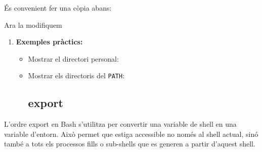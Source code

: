 \documentclass[
  12 pt,
  a4paper,
]{article}
\newenvironment{Shaded}{\begin{snugshade}}{\end{snugshade}}
\newcommand{\BuiltInTok}[1]{#1}
\newcommand{\NormalTok}[1]{#1}
\newcommand{\OperatorTok}[1]{\textcolor[rgb]{0.81,0.36,0.00}{\textbf{#1}}}
\newcommand{\StringTok}[1]{\textcolor[rgb]{0.31,0.60,0.02}{#1}}
\newcommand{\VariableTok}[1]{\textcolor[rgb]{0.00,0.00,0.00}{#1}}
\providecommand{\tightlist}{%
  \setlength{\itemsep}{0pt}\setlength{\parskip}{0pt}}
\begin{document}
És convenient fer una còpia abans:

\begin{Shaded}
\end{Shaded}

Ara la modifiquem

\begin{Shaded}
\end{Shaded}

\begin{enumerate}
\def\labelenumi{\arabic{enumi}.}
\setcounter{enumi}{2}
\tightlist
\item
  \textbf{Exemples pràctics:}

  \begin{itemize}
  \item
    Mostrar el directori personal:

\begin{Shaded}
\end{Shaded}
  \item
    Mostrar els directoris del \texttt{PATH}:

\begin{Shaded}
\end{Shaded}

    \subsection{export}\label{export}
  \end{itemize}
\end{enumerate}

L'ordre export en Bash s'utilitza per convertir una variable de shell en
una variable d'entorn. Això permet que estiga accessible no només al
shell actual, sinó també a tots els processos fills o sub-shells que es
generen a partir d'aquest shell.
\end{document}
